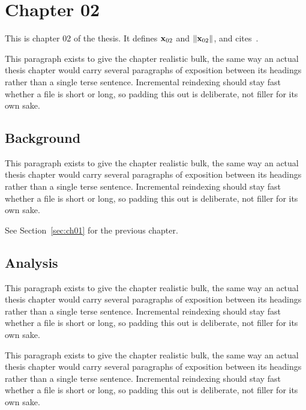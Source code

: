 \section{Chapter 02}
\label{sec:ch02}

This is chapter 02 of the thesis. It defines $\mathbf{x}_{02}$ and $\lVert \mathbf{x}_{02} \rVert$, and cites~\cite{ref1}.

This paragraph exists to give the chapter realistic bulk, the same way an actual thesis chapter would carry several paragraphs of exposition between its headings rather than a single terse sentence. Incremental reindexing should stay fast whether a file is short or long, so padding this out is deliberate, not filler for its own sake.

\subsection{Background}
\label{sec:ch02:background}

This paragraph exists to give the chapter realistic bulk, the same way an actual thesis chapter would carry several paragraphs of exposition between its headings rather than a single terse sentence. Incremental reindexing should stay fast whether a file is short or long, so padding this out is deliberate, not filler for its own sake.

See Section~\ref{sec:ch01} for the previous chapter.

\subsection{Analysis}
\label{sec:ch02:analysis}

This paragraph exists to give the chapter realistic bulk, the same way an actual thesis chapter would carry several paragraphs of exposition between its headings rather than a single terse sentence. Incremental reindexing should stay fast whether a file is short or long, so padding this out is deliberate, not filler for its own sake.

This paragraph exists to give the chapter realistic bulk, the same way an actual thesis chapter would carry several paragraphs of exposition between its headings rather than a single terse sentence. Incremental reindexing should stay fast whether a file is short or long, so padding this out is deliberate, not filler for its own sake.
